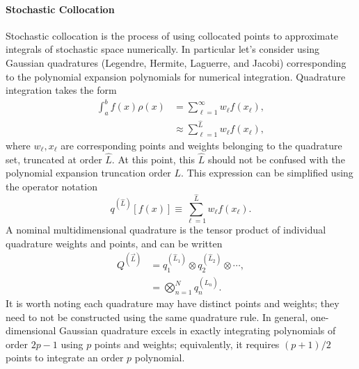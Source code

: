 \paragraph{Stochastic Collocation}\label{sec:stoch coll}
Stochastic collocation is the process of using collocated points to approximate integrals of stochastic space
numerically.  In particular let's consider using Gaussian quadratures (Legendre, Hermite, Laguerre, and Jacobi)
corresponding to the polynomial expansion polynomials for numerical integration.  Quadrature integration takes
the form
\begin{align}
  \int_a^b f(x)\rho(x) &= \sum_{\ell=1}^\infty w_\ell f(x_\ell),\\
  &\approx \sum_{\ell=1}^{\hat L} w_\ell f(x_\ell),
\end{align}
where $w_\ell,x_\ell$ are corresponding points and weights belonging to the quadrature set, truncated at order
$\hat L$.  At this point, this $\hat L$ should not be confused with the polynomial expansion truncation order $L$.  This expression can be simplified using the operator notation
\begin{equation}\label{eq:quad op}
  q^{(\hat L)}[f(x)] \equiv \sum_{\ell=1}^{\hat L} w_\ell f(x_\ell).
\end{equation}
A nominal multidimensional quadrature is the tensor product of
individual quadrature weights and points, and can be written
\begin{align}
  Q^{(\vec{L})} &= q^{(\hat L_1)}_1 \otimes q^{(\hat L_2)}_2 \otimes \cdots,\\
                     &= \bigotimes_{n=1}^N q^{(\hat L_n)}_n.
\end{align}
It is worth noting each quadrature may have distinct points and weights; they need to not be constructed using
the same quadrature rule.
In general, one-dimensional Gaussian
quadrature excels in exactly integrating polynomials of order $2p-1$ using $p$ points and weights;
equivalently, it requires $(p+1)/2$ points to integrate an order $p$ polynomial. 
 
